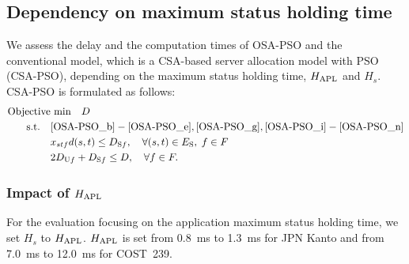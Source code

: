 \documentclass[conference]{IEEEtran}
\begin{document}
\begin{CJK}{UTF8}{ipxm}
\subsection{Dependency on maximum status holding time}
\label{subsec:Dependency_on_maximum_status_holding_time}

We assess the delay and the computation times of OSA-PSO and the conventional model, which is a CSA-based server allocation model with PSO (CSA-PSO), depending on the maximum status holding time, $H_{\rm APL}$ and $H_s$.
CSA-PSO is formulated as follows:
\begin{subequations} \label{CSA-PSO}
  \begin{align}
  \text{Objective}&\text{ min}\quad D \label{CSA-PSO_a} \\
  \rm{s.t.} \quad
  & \eqref{OSA-PSO_b}-\eqref{OSA-PSO_e}, \eqref{OSA-PSO_g}, \eqref{OSA-PSO_i}-\eqref{OSA-PSO_n} \label{CSA-PSO_b} \\
  &x_{stf}d(s,t) \le D_{\mathrm{S}f}, \quad \forall (s,t) \in E_{\rm{S}}, \; f \in F \label{CSA-PSO_c} \\
  &2D_{\mathrm{U}f} + D_{\mathrm{S}f} \leq D, \quad \forall f \in F. \label{CSA-PSO_d}
  \end{align}
\end{subequations}

\subsubsection{Impact of $H_{\rm APL}$}

For the evaluation focusing on the application maximum status holding time, we set $H_s$ to $H_{\rm APL}$.
$H_{\rm APL}$ is set from 0.8~ms to 1.3~ms for JPN Kanto and from 7.0~ms to 12.0~ms for COST~239.


\end{CJK}
\end{document}
